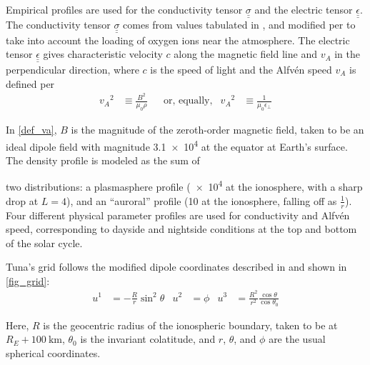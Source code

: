 \documentclass{article}
\newcommand{\Alfven}{Alfv\'en\xspace}
\newcommand{\lysakx}{\ensuremath{u^1}\xspace}
\newcommand{\lysaky}{\ensuremath{u^2}\xspace}
\newcommand{\lysakz}{\ensuremath{u^3}\xspace}
\newcommand{\tensor}[1]{\ensuremath{\underline{\underline{#1}}}}
\newcommand{\va}{\ensuremath{v_A}\xspace}
\newcommand{\ep}{\ensuremath{\epsilon_\bot}\xspace}
\newcommand{\mz}{\ensuremath{\mu_0}\xspace}
\begin{document}

Empirical profiles are used for the conductivity tensor $\tensor{\sigma}$ and the electric tensor $\tensor{\epsilon}$. The conductivity tensor $\tensor{\sigma}$ comes from values tabulated in \cite{kelley_1989}, and modified per \cite{lysak_2013} to take into account the loading of oxygen ions near the atmosphere. The electric tensor $\tensor{\epsilon}$ gives characteristic velocity $c$ along the magnetic field line and $\va$ in the perpendicular direction, where $c$ is the speed of light and the \Alfven speed $\va$ is defined per
\begin{align}
    \label{def_va}
    \va^2 &\equiv \frac{B^2}{\mz\rho} &
    & \text{or, equally,} &
    \va^2 &\equiv \frac{1}{\mz\ep}
\end{align}

In \cref{def_va}, $B$ is the magnitude of the zeroth-order magnetic field, taken to be an ideal dipole field with magnitude \SI{3.1e4}{\nT} at the equator at Earth's surface. The density profile is modeled as the sum of

two distributions: a plasmasphere profile (\SI{e4}{\percc} at the ionosphere, with a sharp drop at $L = 4$), and an ``auroral'' profile (\SI{10}{\percc} at the ionosphere, falling off as $\frac{1}{r}$). Four different physical parameter profiles are used for conductivity and \Alfven speed, corresponding to dayside and nightside conditions at the top and bottom of the solar cycle.


Tuna's grid follows the modified dipole coordinates described in \cite{lysak_2004} and shown in \cref{fig_grid}:
\begin{align}
  \label{def_coords}
  \lysakx & = - \frac{R}{r} \sin^2 \theta &
  \lysaky & = \phi &
  \lysakz & = \frac{R^2}{r^2} \frac{\cos \theta}{\cos \theta_0}
\end{align}

Here, $R$ is the geocentric radius of the ionospheric boundary, taken to be at $R_E + \SI{100}{\km}$, $\theta_0$ is the invariant colatitude, and $r$, $\theta$, and $\phi$ are the usual spherical coordinates.
\end{document}
